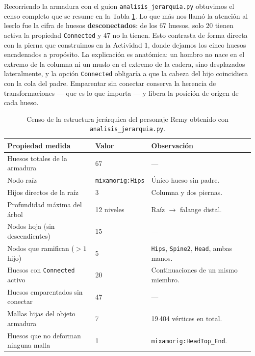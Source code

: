 Recorriendo la armadura con el guion \texttt{analisis\_jerarquia.py} obtuvimos el censo completo que se resume en la Tabla \ref{tab:censo_armadura}. Lo que más nos llamó la atención al leerlo fue la cifra de huesos \textbf{desconectados}: de los 67 huesos, solo 20 tienen activa la propiedad \texttt{Connected} y 47 no la tienen. Esto contrasta de forma directa con la pierna que construimos en la Actividad 1, donde dejamos los cinco huesos encadenados a propósito. La explicación es anatómica: un hombro no nace en el extremo de la columna ni un muslo en el extremo de la cadera, sino desplazados lateralmente, y la opción \texttt{Connected} obligaría a que la cabeza del hijo coincidiera con la cola del padre. Emparentar sin conectar conserva la herencia de transformaciones --- que es lo que importa --- y libera la posición de origen de cada hueso.

\begin{table}[H]
\centering
\begin{tabular}{@{}p{7.6cm}p{3.0cm}p{4.4cm}@{}}
\toprule
\textbf{Propiedad medida} & \textbf{Valor} & \textbf{Observación} \\
\midrule
Huesos totales de la armadura       & 67 & --- \\
Nodo raíz                           & \texttt{mixamorig:Hips} & Único hueso sin padre. \\
Hijos directos de la raíz           & 3  & Columna y dos piernas. \\
Profundidad máxima del árbol        & 12 niveles & Raíz $\to$ falange distal. \\
Nodos hoja (sin descendientes)      & 15 & --- \\
Nodos que ramifican ($>1$ hijo)     & 5  & \texttt{Hips}, \texttt{Spine2}, \texttt{Head}, ambas manos. \\
Huesos con \texttt{Connected} activo & 20 & Continuaciones de un mismo miembro. \\
Huesos emparentados sin conectar    & 47 & --- \\
Mallas hijas del objeto armadura    & 7  & 19\,404 vértices en total. \\
Huesos que no deforman ninguna malla & 1 & \texttt{mixamorig:HeadTop\_End}. \\
\bottomrule
\end{tabular}
\caption{Censo de la estructura jerárquica del personaje Remy obtenido con \texttt{analisis\_jerarquia.py}.}
\label{tab:censo_armadura}
\end{table}

